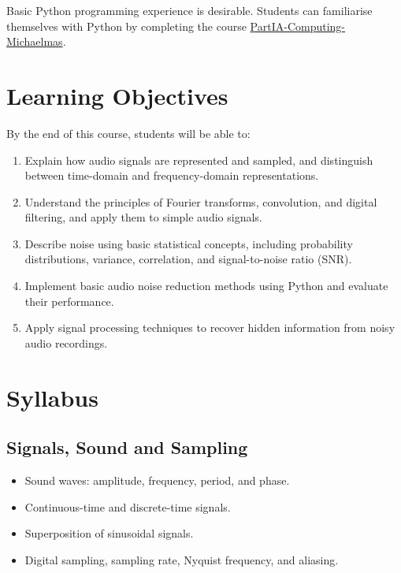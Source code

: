 \documentclass[12pt,fontset=none]{ctexart}
\begin{document}
Basic Python programming experience is desirable. Students can familiarise themselves with Python by completing the course \href{https://github.com/CambridgeEngineering/PartIA-Computing-Michaelmas}{PartIA-Computing-Michaelmas}.

\section{Learning Objectives}

By the end of this course, students will be able to:

\begin{enumerate}
  \item Explain how audio signals are represented and
  sampled, and distinguish between time-domain and
  frequency-domain representations.

  \item Understand the principles of Fourier transforms,
  convolution, and digital filtering, and apply them
  to simple audio signals.

  \item Describe noise using basic statistical concepts,
  including probability distributions, variance,
  correlation, and signal-to-noise ratio (SNR).

  \item Implement basic audio noise reduction methods
  using Python and evaluate their performance.

  \item Apply signal processing techniques to recover
  hidden information from noisy audio recordings.
\end{enumerate}

\section{Syllabus}

\subsection{Signals, Sound and Sampling}

\begin{itemize}
  \item Sound waves: amplitude, frequency, period,
  and phase.
  \item Continuous-time and discrete-time signals.
  \item Superposition of sinusoidal signals.
  \item Digital sampling, sampling rate, Nyquist
  frequency, and aliasing.
\end{itemize}
\end{document}
